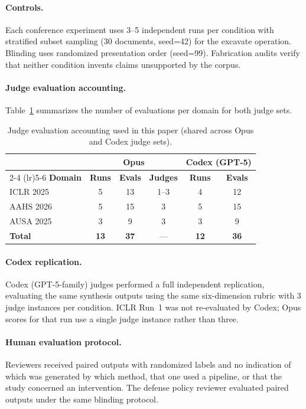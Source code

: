 \documentclass{article}
\begin{document}
\paragraph{Controls.} Each conference experiment uses 3--5 independent runs per condition with stratified subset sampling (30 documents, seed=42) for the excavate operation. Blinding uses randomized presentation order (seed=99). Fabrication audits verify that neither condition invents claims unsupported by the corpus.

\paragraph{Judge evaluation accounting.} Table~\ref{tab:judge_accounting} summarizes the number of evaluations per domain for both judge sets.

\begin{table}[h]
\caption{Judge evaluation accounting used in this paper (shared across Opus and Codex judge sets).}
\label{tab:judge_accounting}
\begin{center}
\begin{tabular}{lccccc}
\toprule
& \multicolumn{3}{c}{\textbf{Opus}} & \multicolumn{2}{c}{\textbf{Codex (GPT-5)}} \\
\cmidrule(lr){2-4} \cmidrule(lr){5-6}
\textbf{Domain} & \textbf{Runs} & \textbf{Evals} & \textbf{Judges} & \textbf{Runs} & \textbf{Evals} \\
\midrule
ICLR 2025 & 5 & 13 & 1--3 & 4 & 12 \\
AAHS 2026 & 5 & 15 & 3 & 5 & 15 \\
AUSA 2025 & 3 & 9 & 3 & 3 & 9 \\
\midrule
\textbf{Total} & \textbf{13} & \textbf{37} & --- & \textbf{12} & \textbf{36} \\
\bottomrule
\end{tabular}
\end{center}
\end{table}

\paragraph{Codex replication.} Codex (GPT-5-family) judges performed a full independent replication, evaluating the same synthesis outputs using the same six-dimension rubric with 3 judge instances per condition. ICLR Run~1 was not re-evaluated by Codex; Opus scores for that run use a single judge instance rather than three.

\paragraph{Human evaluation protocol.} Reviewers received paired outputs with randomized labels and no indication of which was generated by which method, that one used a pipeline, or that the study concerned an intervention. The defense policy reviewer evaluated paired outputs under the same blinding protocol.
\end{document}
